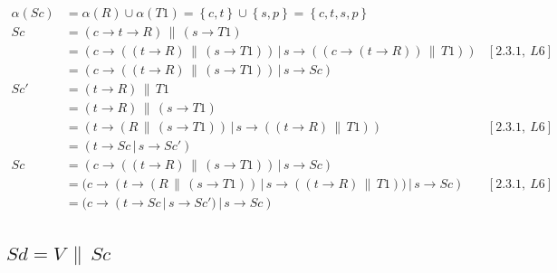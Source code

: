 \documentclass[11pt,a4paper]{article}
\def\ra{\rightarrow}
\def\cc{\,\|\,}
\def\ch{\,|\,}
\newcommand{\sN}[1]{\left \lbrace #1 \right \rbrace}
\begin{document}
\begin{align*}
    \alpha(Sc) &= \alpha (R) \cup \alpha(T1) = \sN{c,t} \cup \sN{s,p} = \sN{c,t,s,p} & \\
    Sc &= (c \ra t \ra R) \cc (s \ra T1) & \\
       &= (c \ra ((t \ra R)\cc (s \ra T1)) \ch s \ra ( (c \ra (t \ra R)) \cc T1)) & [2.3.1,~L6] \\
       &= (c \ra ((t \ra R)\cc (s \ra T1)) \ch s \ra Sc) & \\
    Sc' &= (t \ra R) \cc T1 & \\
        &= (t \ra R) \cc (s \ra T1) \\
    &= (t \ra ( R \cc (s \ra T1)) \ch s \ra ((t \ra R) \cc T1)) & [2.3.1,~L6] \\
    &= (t \ra Sc \ch s \ra Sc') & \\
    Sc &= (c \ra ((t \ra R)\cc (s \ra T1)) \ch s \ra  Sc) & \\
       &= (c \ra (t \ra (R \cc (s \ra T1)) \ch s \ra ((t \ra R) \cc T1)) \ch s \ra  Sc) & [2.3.1,~L6] \\
       &= (c \ra (t \ra Sc \ch s \ra Sc') \ch s \ra  Sc) & \\
\end{align*}

\subsection{$Sd = V \cc Sc$}
\end{document}
